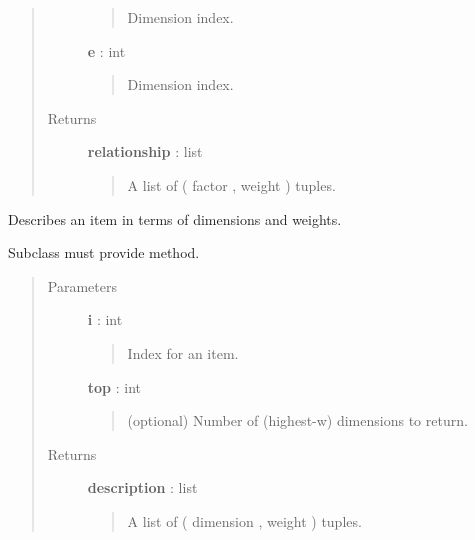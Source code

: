 \documentclass[letterpaper,10pt,english]{sphinxmanual}
\begin{document}
\begin{fulllineitems}
\begin{fulllineitems}
\begin{quote}
\begin{description}
\begin{quote}
Dimension index.
\end{quote}

\textbf{e} : int
\begin{quote}

Dimension index.
\end{quote}

\item[{Returns}] \leavevmode
\textbf{relationship} : list
\begin{quote}

A list of ( factor ,  weight ) tuples.
\end{quote}

\end{description}\end{quote}

\end{fulllineitems}


\begin{fulllineitems}
\label{tethne.model.basemodel:tethne.model.basemodel.BaseModel.item}
Describes an item in terms of dimensions and weights.

Subclass must provide  method.
\begin{quote}\begin{description}
\item[{Parameters}] \leavevmode
\textbf{i} : int
\begin{quote}

Index for an item.
\end{quote}

\textbf{top} : int
\begin{quote}

(optional) Number of (highest-w) dimensions to return.
\end{quote}

\item[{Returns}] \leavevmode
\textbf{description} : list
\begin{quote}

A list of ( dimension , weight ) tuples.
\end{quote}

\end{description}\end{quote}

\end{fulllineitems}


\end{fulllineitems}
\end{document}
